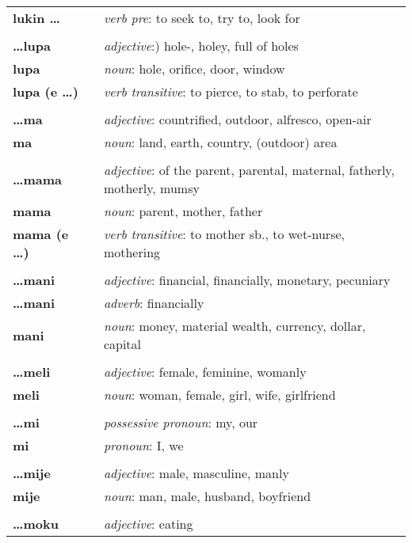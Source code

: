 \begin{supertabular}{p{2,5cm}|ll}
\textbf{lukin \dots} && \textit{verb pre}: to seek to, try to, look for \\ 
 && \\ %
\textbf{\dots lupa} && \textit{adjective}:) hole-, holey, full of holes \\ 
\textbf{lupa} && \textit{noun}: hole, orifice, door, window \\ 
\textbf{lupa (e \dots)} && \textit{verb transitive}: to pierce, to stab, to perforate \\ 
 && \\ %
\textbf{\dots ma} && \textit{adjective}: countrified, outdoor, alfresco, open-air \\ 
\textbf{ma} && \textit{noun}: land, earth, country, (outdoor) area \\ 
 && \\ %
\textbf{\dots mama} && \textit{adjective}: of the parent, parental, maternal, fatherly, motherly, mumsy \\ 
\textbf{mama} && \textit{noun}: parent, mother, father \\ 
\textbf{mama (e \dots)} && \textit{verb transitive}: to mother sb., to wet-nurse, mothering \\ 
 && \\ %
\textbf{\dots mani} && \textit{adjective}: financial, financially, monetary, pecuniary \\ 
\textbf{\dots mani} && \textit{adverb}: financially \\ 
\textbf{mani} && \textit{noun}: money, material wealth, currency, dollar, capital \\ 
 && \\ %
\textbf{\dots meli} && \textit{adjective}: female, feminine, womanly \\ 
\textbf{meli} && \textit{noun}: woman, female, girl, wife, girlfriend \\ 
 && \\ %
\textbf{\dots mi} && \textit{possessive pronoun}: my, our \\  
\textbf{mi} && \textit{pronoun}: I, we  \\ 
 && \\ %
\textbf{\dots mije} && \textit{adjective}: male, masculine, manly \\ 
\textbf{mije} && \textit{noun}: man, male, husband, boyfriend \\ 
 && \\ %
\textbf{\dots moku} && \textit{adjective}: eating \\ 

\end{supertabular}
